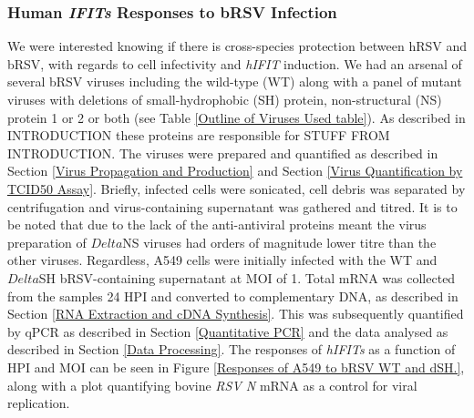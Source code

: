 \subsubsection{Human \textit{IFITs} Responses to bRSV Infection} \label{Human IFITs Responses to bRSV}
We were interested knowing if there is cross-species protection between hRSV and bRSV, with regards to cell infectivity and \textit{hIFIT} induction. We had an arsenal of several bRSV viruses including the wild-type (WT) along with a panel of mutant viruses with deletions of small-hydrophobic (SH) protein, non-structural (NS) protein 1 or 2 or both (see Table \ref{Outline of Viruses Used table}). As described in INTRODUCTION these proteins are responsible for STUFF FROM INTRODUCTION. The viruses were prepared and quantified as described in Section \ref{Virus Propagation and Production} and Section \ref{Virus Quantification by TCID50 Assay}. Briefly, infected cells were sonicated, cell debris was separated by centrifugation and virus-containing supernatant was gathered and titred. It is to be noted that due to the lack of the anti-antiviral proteins meant the virus preparation of \(Delta\)NS viruses had orders of magnitude lower titre than the other viruses. Regardless, A549 cells were initially infected with the WT and \(Delta\)SH bRSV-containing supernatant at MOI of 1. Total mRNA was collected from the samples 24 HPI and converted to complementary DNA, as described in Section \ref{RNA Extraction and cDNA Synthesis}. This was subsequently quantified by qPCR as described in Section \ref{Quantitative PCR} and the data analysed as described in Section \ref{Data Processing}. The responses of \textit{hIFITs} as a function of HPI and MOI can be seen in Figure \ref{Responses of A549 to bRSV WT and dSH.}, along with a plot quantifying bovine \textit{RSV N} mRNA as a control for viral replication.

